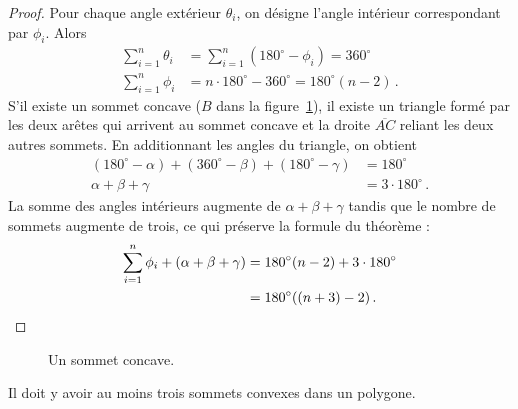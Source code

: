 \begin{proof}
Pour chaque angle extérieur $\theta_i$, on désigne l'angle intérieur correspondant par $\phi_i$. Alors 
\begin{align*}
\displaystyle\sum_{i=1}^n \theta_i &=\displaystyle\sum_{i=1}^n (180^\circ-\phi_i)= 360^\circ\\
\displaystyle\sum_{i=1}^n \phi_i &= n\cdot 180^\circ-360^\circ =180^\circ(n-2)\,.
\end{align*}
S'il existe un sommet concave ($B$ dans la figure~\ref{f.museum.concave}), il existe un triangle formé par les deux arêtes qui arrivent au sommet concave et la droite $\overline{AC}$ reliant les deux autres sommets. En additionnant les angles du triangle, on obtient 
\begin{align*}
(180^\circ - \alpha) + (360^\circ - \beta) + (180^\circ - \gamma) &= 180^\circ\\
\alpha + \beta + \gamma &= 3\cdot 180^\circ\,.
\end{align*}
La somme des angles intérieurs augmente de $\alpha+\beta+\gamma$ tandis que le nombre de sommets augmente de trois, ce qui  préserve  la formule du théorème :
\begin{align*}
\displaystyle\sum_{i=1}^n \phi_i + (\alpha + \beta + \gamma) &= 180^\circ(n-2)+3\cdot 180^\circ\\
&= 180^\circ((n+3)-2)\,.\qedhere
\end{align*}
\end{proof}

\begin{figure}[htbp]
\centering
{}
\caption{Un sommet concave.}
\label{f.museum.concave}
\end{figure}


\begin{theorem}\label{thm.convex}
Il doit y avoir au moins trois sommets convexes dans un polygone.
\end{theorem}

